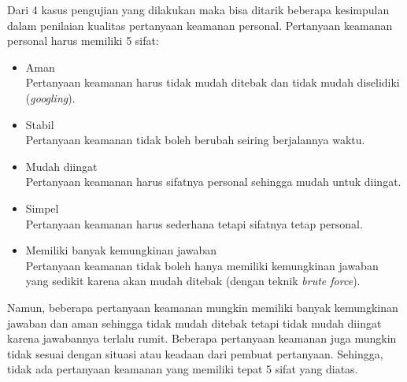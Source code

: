 Dari 4 kasus pengujian yang dilakukan maka bisa ditarik beberapa kesimpulan dalam penilaian kualitas pertanyaan keamanan personal. Pertanyaan keamanan personal harus memiliki 5 sifat:
\begin{itemize}
	\item Aman \\
	Pertanyaan keamanan harus tidak mudah ditebak dan tidak mudah diselidiki (\textit{googling}).
	\item Stabil \\
	Pertanyaan keamanan tidak boleh berubah seiring berjalannya waktu.
	\item Mudah diingat \\
	Pertanyaan keamanan harus sifatnya personal sehingga mudah untuk diingat.
	\item Simpel \\
	Pertanyaan keamanan harus sederhana tetapi sifatnya tetap personal.
	\item Memiliki banyak kemungkinan jawaban \\
	Pertanyaan keamanan tidak boleh hanya memiliki kemungkinan jawaban yang sedikit karena akan mudah ditebak (dengan teknik \textit{brute force}).
\end{itemize}

Namun, beberapa pertanyaan keamanan mungkin memiliki banyak kemungkinan jawaban dan aman sehingga tidak mudah ditebak tetapi tidak mudah diingat karena jawabannya terlalu rumit. Beberapa pertanyaan keamanan juga mungkin tidak sesuai dengan situasi atau keadaan dari pembuat pertanyaan. Sehingga, tidak ada pertanyaan keamanan yang memiliki tepat 5 sifat yang diatas.